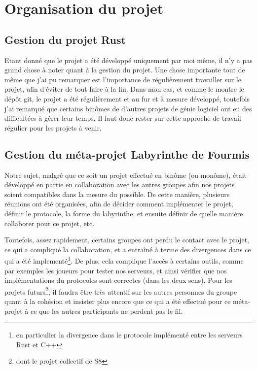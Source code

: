\documentclass{EPUProjetDi}
\begin{document}
\chapter{Organisation du projet}

\section{Gestion du projet Rust}

Etant donné que le projet a été développé uniquement par moi même, il n'y a pas grand chose à noter quant à la gestion du projet. Une chose importante tout de même que j'ai pu remarquer est l'importance de régulièrement travailler sur le projet, afin d'éviter de tout faire à la fin. Dans mon cas, et comme le montre le dépôt git, le projet a été régulièrement et au fur et à mesure développé, toutefois j'ai remarqué que certains binômes de d'autres projets de génie logiciel ont eu des difficultées à gérer leur temps. Il faut donc rester sur cette approche de travail régulier pour les projets à venir.

\section{Gestion du méta-projet Labyrinthe de Fourmis}

Notre sujet, malgré que ce soit un projet effectué en binôme (ou monôme), était développé en partie en collaboration avec les autres groupes afin nos projets soient compatibles dans la mesure du possible. De cette manière, plusieurs réunions ont été organisées, afin de décider comment implémenter le projet, définir le protocole, la forme du labyrinthe, et ensuite définir de quelle manière collaborer pour ce projet, etc.

Toutefois, assez rapidement, certains groupes ont perdu le contact avec le projet, ce qui a compliqué la collaboration, et a entraîné à terme des divergences dans ce qui a été implementé\footnote{en particulier la divergence dans le protocole implémenté entre les serveurs Rust et C++}. De plus, cela complique l'accès à certains outils, comme par exemples les joueurs pour tester nos serveurs, et ainsi vérifier que nos implémentations du protocoles sont correctes (dans les deux sens). Pour les projets futurs\footnote{dont le projet collectif de S8}, il faudra être très attentif sur les autres personnes du groupe quant à la cohésion et insister plus encore que ce qui a été effectué pour ce méta-projet à ce que les autres participants ne perdent pas le fil.
\end{document}
